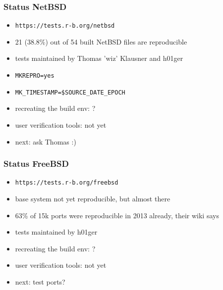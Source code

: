 \documentclass[14pt,aspectratio=169]{beamer}
\begin{document}
\begin{frame}
 \frametitle{Status NetBSD}
 \begin{itemize}
  \item \texttt{https://tests.r-b.org/netbsd}
  \item 21 (38.8\%) out of 54 built NetBSD files are reproducible
  \item tests maintained by Thomas 'wiz' Klausner and h01ger
  \item \texttt{MKREPRO=yes}
  \item \texttt{MK\_TIMESTAMP=\$SOURCE\_DATE\_EPOCH}
  \item recreating the build env: ?
  \item user verification tools: not yet
  \item next: ask Thomas :)
 \end{itemize}
\end{frame}

\begin{frame}
 \frametitle{Status FreeBSD}
 \begin{itemize}
  \item \texttt{https://tests.r-b.org/freebsd}
  \item base system not yet reproducible, but almost there
  \item 63\% of 15k ports were reproducible in 2013 already, their wiki says
  \item tests maintained by h01ger
  \item recreating the build env: ?
  \item user verification tools: not yet
  \item next: test ports?
 \end{itemize}
\end{frame}
\end{document}
